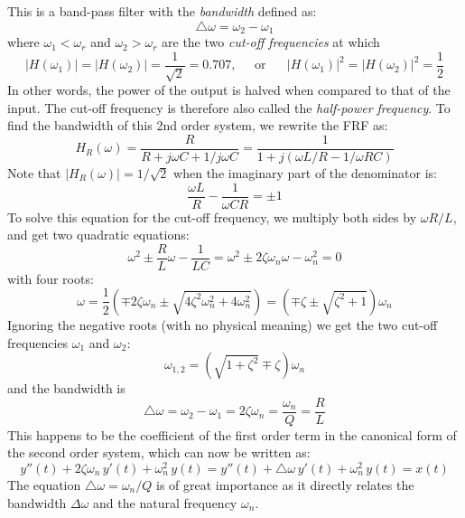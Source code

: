 \documentclass{article}
\begin{document}
\begin{itemize}
  This is a band-pass filter with the {\em bandwidth} defined as:
  \begin{equation} 
    \triangle \omega=\omega_2-\omega_1 
  \end{equation}
  where $\omega_1<\omega_r$ and $\omega_2>\omega_r$ are the two 
  {\em cut-off frequencies} at which
  \begin{equation} 
    |H(\omega_1)|=|H(\omega_2)|=\frac{1}{\sqrt{2}}=0.707,\;\;\;\;\;\mbox{or}
    \;\;\;\;\;\;|H(\omega_1)|^2=|H(\omega_2)|^2=\frac{1}{2}
  \end{equation}
  In other words, the power of the output is halved when compared to 
  that of the input. The cut-off frequency is therefore also called the 
  {\em half-power frequency}. To find the bandwidth of this 2nd order 
  system, we rewrite the FRF as:
  \begin{equation}
    H_R(\omega)=\frac{R}{R+j\omega C+1/j\omega C}
    =\frac{1}{1+j(\omega L/R-1/\omega RC)}
  \end{equation}
  Note that $|H_R(\omega)|=1/\sqrt{2}$ when the imaginary part of the 
  denominator is:
  \begin{equation}
    \frac{\omega L}{R}-\frac{1}{\omega CR}=\pm 1
  \end{equation}
  To solve this equation for the cut-off frequency, we multiply both sides
  by $\omega R/L$, and get two quadratic equations:
  \begin{equation}
    \omega^2\pm \frac{R}{L}\omega-\frac{1}{LC}=\omega^2\pm 2\zeta\omega_n\omega-\omega_n^2=0
  \end{equation}
  with four roots:
  \begin{equation}
    \omega=\frac{1}{2}\left(\mp 2\zeta\omega_n\pm\sqrt{4\zeta^2\omega_n^2+4\omega_n^2}\right)
    =\left(\mp\zeta\pm\sqrt{\zeta^2+1}\right)\omega_n
  \end{equation}
  Ignoring the negative roots (with no physical meaning) we get
  the two cut-off frequencies $\omega_1$ and $\omega_2$:
  \begin{equation}
    \omega_{1,2}=\left(\sqrt{1+\zeta^2}\mp \zeta\right) \omega_n
  \end{equation}
  and the bandwidth is
  \begin{equation}
    \triangle \omega=\omega_2-\omega_1=2\zeta \omega_n=\frac{\omega_n}{Q}
  =\frac{R}{L}
  \end{equation}
  This happens to be the coefficient of the first order term in the 
  canonical form of the second order system, which can now be written as:
  \begin{equation} 
    y''(t)+2\zeta\omega_n\,y'(t)+\omega_n^2\, y(t)
    =y''(t)+\triangle\omega\,y'(t)+\omega_n^2\, y(t)= x(t) 
  \end{equation}
  The equation $\triangle\omega=\omega_n/Q$ is of great importance as
  it directly relates the bandwidth $\Delta\omega$ and the natural 
  frequency $\omega_n$.


\end{itemize}
\end{document}
